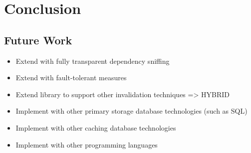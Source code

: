 \chapter{Conclusion}
\label{chapter:conclusion}




\section{Future Work}
\label{sec:future_work}

\begin{itemize}
  \item Extend with fully transparent dependency sniffing
  \item Extend with fault-tolerant measures
  \item Extend library to support other invalidation techniques => HYBRID
  \item Implement with other primary storage database technologies (such as SQL)
  \item Implement with other caching database technologies
  \item Implement with other programming languages
\end{itemize}





